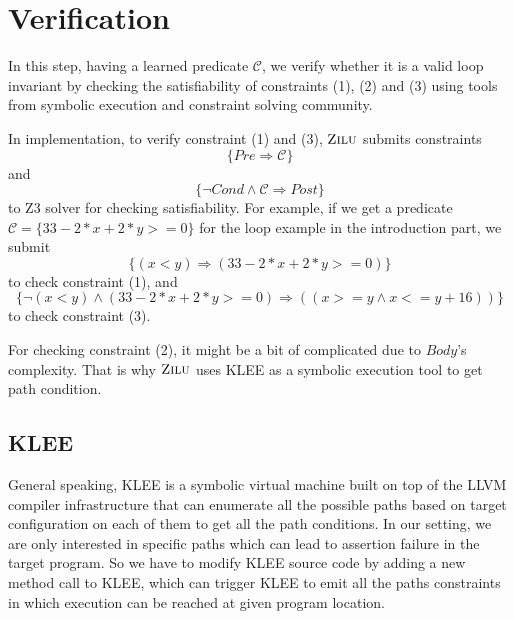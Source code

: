 
\section{Verification} %
\label{sec:verification}

In this step, having a learned predicate $\mathcal{C}$, we verify whether it is a valid loop invariant by
checking the satisfiability of constraints (1), (2) and (3) using tools from symbolic execution and constraint solving community.

In implementation, to verify constraint (1) and (3), 
$\textsc{Zilu}$ submits constraints $$\{Pre \Rightarrow \mathcal{C}\}$$ and $$\{\neg {Cond} \wedge \mathcal{C} \Rightarrow Post\}$$ to Z3 solver for checking satisfiability.
For example, if we get a predicate $\mathcal{C} = \{33-2*x+2*y>=0\}$
for the loop example in the introduction part, 
we submit 
$$\{(x<y) \Rightarrow (33-2*x+2*y>=0)\}$$
to check constraint (1), 
and 
$$\{\neg(x<y) \wedge (33-2*x+2*y>=0) \Rightarrow ((x >= y \wedge x <= y + 16))\}$$
to check constraint (3).

For checking constraint (2), it might be a bit of complicated due to $Body$'s complexity.
That is why $\textsc{Zilu}$ uses KLEE\cite{cadar2008klee} as a symbolic execution tool to get path condition.





\subsection{KLEE}
General speaking, KLEE\cite{cadar2008klee} is a symbolic virtual machine built on top of the LLVM compiler infrastructure
that can enumerate all the possible paths based on target configuration on each of them to get all the path conditions.
In our setting, we are only interested in specific paths which can lead to assertion failure in the target program.
So we have to modify KLEE source code by adding a new method call to KLEE,
which can trigger KLEE to emit all the paths constraints in which execution can be reached at given program location.

